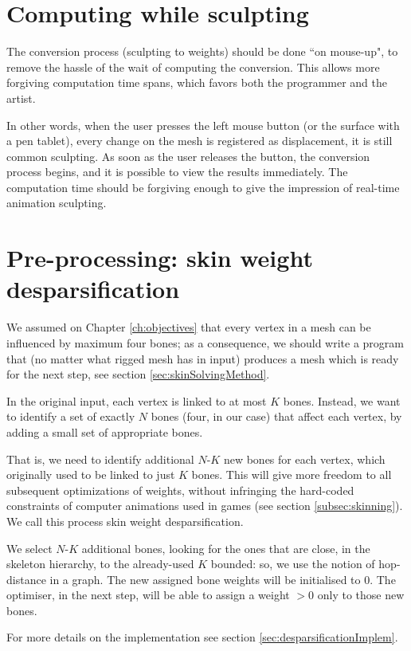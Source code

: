 \documentclass[12pt,twoside]{report}
\begin{document}
\section{Computing while sculpting}

The conversion process (sculpting to weights) should be done ``on mouse-up", to remove the hassle of the wait of computing the conversion. This allows more forgiving computation time spans, which favors both the programmer and the artist.

In other words, when the user presses the left mouse button (or the surface with a pen tablet), every change on the mesh is registered as displacement, it is still common sculpting. As soon as the user releases the button, the conversion process begins, and it is possible to view the results immediately. The computation time should be forgiving enough to give the impression of real-time animation sculpting.

\section{Pre-processing: skin weight desparsification}
\label{sec:desparsificationMethod}
We assumed on Chapter \ref{ch:objectives} that every vertex in a mesh can be influenced by maximum four bones; as a consequence, we should write a program that  (no matter what rigged mesh has in input) produces a mesh which is ready for the next step, see section \ref{sec:skinSolvingMethod}.

In the original input, each vertex is linked to at most $K$ bones. Instead, we want to identify a set of exactly $N$ bones (four, in our case) that affect each vertex, by adding a small set of appropriate bones.

That is, we need to identify additional $N$-$K$ new bones for each vertex, which originally used to be linked to just $K$ bones. This will give more freedom to all subsequent optimizations of weights, without infringing the hard-coded constraints of computer animations used in games (see section \ref{subsec:skinning}). We call this process skin weight desparsification.

We select $N$-$K$ additional bones, looking for the ones that are close, in the skeleton hierarchy, to the already-used $K$ bounded: so, we use the notion of hop-distance in a graph. The new assigned bone weights will be initialised to $0$. The optimiser, in the next step, will be able to assign a weight $>0$ only to those new bones.

For more details on the implementation see section \ref{sec:desparsificationImplem}.
\end{document}

